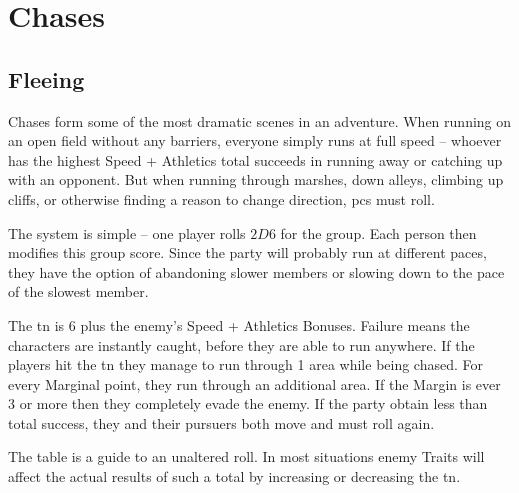 \section{Chases}

\begin{multicols}{2}

\subsection{Fleeing}

Chases form some of the most dramatic scenes in an adventure. When running on an open field without any barriers, everyone simply runs at full speed -- whoever has the highest Speed + Athletics total succeeds in running away or catching up with an opponent.  But when running through marshes, down alleys, climbing up cliffs, or otherwise finding a reason to change direction, \glspl{pc} must roll.

The system is simple -- one player rolls $2D6$ for the group. Each person then modifies this group score. Since the party will probably run at different paces, they have the option of abandoning slower members or slowing down to the pace of the slowest member.

The \gls{tn} is 6 plus the enemy's Speed + Athletics Bonuses. Failure means the characters are instantly caught, before they are able to run anywhere. If the players hit the \gls{tn} they manage to run through 1 area while being chased. For every Marginal point, they run through an additional area. If the Margin is ever 3 or more then they completely evade the enemy. If the party obtain less than total success, they and their pursuers both move and must roll again.

The table is a guide to an unaltered roll. In most situations enemy Traits will affect the actual results of such a total by increasing or decreasing the \gls{tn}.

\end{multicols}

